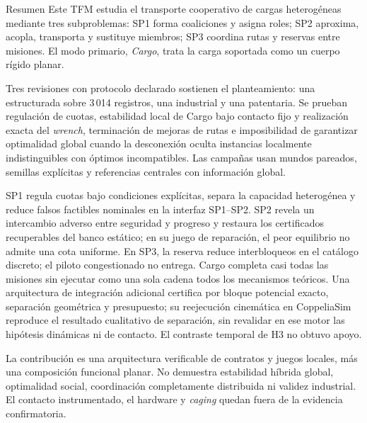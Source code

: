 \begin{viuabstract}{Resumen}
Este TFM estudia el transporte cooperativo de cargas heterogéneas mediante tres
subproblemas: SP1 forma coaliciones y asigna roles; SP2 aproxima, acopla,
transporta y sustituye miembros; SP3 coordina rutas y reservas entre misiones.
El modo primario, \emph{Cargo}, trata la carga soportada como un cuerpo rígido
planar.

Tres revisiones con protocolo declarado sostienen el planteamiento: una
estructurada sobre 3\,014 registros, una industrial y una patentaria. Se
prueban regulación de cuotas, estabilidad local de Cargo bajo contacto fijo y
realización exacta del \emph{wrench}, terminación de mejoras de rutas e
imposibilidad de garantizar optimalidad global cuando la desconexión oculta
instancias localmente indistinguibles con óptimos incompatibles. Las campañas
usan mundos pareados, semillas explícitas y referencias centrales con
información global.

SP1 regula cuotas bajo condiciones explícitas, separa la capacidad heterogénea
y reduce falsos factibles nominales en la interfaz SP1--SP2. SP2 revela un intercambio
adverso entre seguridad y progreso y restaura los certificados recuperables del
banco estático; en su juego de reparación, el peor equilibrio no admite una
cota uniforme. En SP3, la reserva reduce
interbloqueos en el catálogo discreto; el piloto congestionado no entrega.
Cargo completa casi todas las misiones sin ejecutar como una sola cadena todos
los mecanismos teóricos. Una arquitectura de integración adicional certifica
por bloque potencial exacto, separación geométrica y presupuesto; su
reejecución cinemática en CoppeliaSim reproduce el resultado cualitativo de
separación, sin revalidar en ese motor las hipótesis dinámicas ni de contacto.
El contraste temporal de H3 no obtuvo apoyo.

La contribución es una arquitectura verificable de contratos y juegos locales,
más una composición funcional planar. No demuestra estabilidad híbrida global,
optimalidad social, coordinación completamente distribuida ni validez
industrial. El contacto instrumentado, el hardware y \emph{caging} quedan fuera
de la evidencia confirmatoria.

\end{viuabstract}

\clearpage
